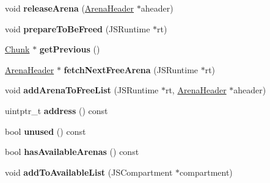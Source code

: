 \begin{DoxyCompactItemize}
\item 
\hypertarget{structjs_1_1gc_1_1_chunk_a7af13b6666f438363137ac68f96cf361}{void {\bfseries release\-Arena} (\hyperlink{structjs_1_1gc_1_1_arena_header}{Arena\-Header} $\ast$aheader)}\label{structjs_1_1gc_1_1_chunk_a7af13b6666f438363137ac68f96cf361}

\item 
\hypertarget{structjs_1_1gc_1_1_chunk_a4a41b7b1dc9e8066d4490ce9a30b75c1}{void {\bfseries prepare\-To\-Be\-Freed} (J\-S\-Runtime $\ast$rt)}\label{structjs_1_1gc_1_1_chunk_a4a41b7b1dc9e8066d4490ce9a30b75c1}

\item 
\hypertarget{structjs_1_1gc_1_1_chunk_a5dbfba26018cab3e0abc61b0b3f46f3c}{\hyperlink{structjs_1_1gc_1_1_chunk}{Chunk} $\ast$ {\bfseries get\-Previous} ()}\label{structjs_1_1gc_1_1_chunk_a5dbfba26018cab3e0abc61b0b3f46f3c}

\item 
\hypertarget{structjs_1_1gc_1_1_chunk_aaec4f13dee8aa15d1c1c41eb6d999dbe}{\hyperlink{structjs_1_1gc_1_1_arena_header}{Arena\-Header} $\ast$ {\bfseries fetch\-Next\-Free\-Arena} (J\-S\-Runtime $\ast$rt)}\label{structjs_1_1gc_1_1_chunk_aaec4f13dee8aa15d1c1c41eb6d999dbe}

\item 
\hypertarget{structjs_1_1gc_1_1_chunk_a0ad58f1e12a1a04e9476dcfd1063e554}{void {\bfseries add\-Arena\-To\-Free\-List} (J\-S\-Runtime $\ast$rt, \hyperlink{structjs_1_1gc_1_1_arena_header}{Arena\-Header} $\ast$aheader)}\label{structjs_1_1gc_1_1_chunk_a0ad58f1e12a1a04e9476dcfd1063e554}

\item 
\hypertarget{structjs_1_1gc_1_1_chunk_a131d38aac05dc13be8867726974ddeeb}{uintptr\-\_\-t {\bfseries address} () const }\label{structjs_1_1gc_1_1_chunk_a131d38aac05dc13be8867726974ddeeb}

\item 
\hypertarget{structjs_1_1gc_1_1_chunk_a4a4fd0008ac116146a22b7b30d8401ec}{bool {\bfseries unused} () const }\label{structjs_1_1gc_1_1_chunk_a4a4fd0008ac116146a22b7b30d8401ec}

\item 
\hypertarget{structjs_1_1gc_1_1_chunk_a60ddab1f056036f51c5afdc3789f8a71}{bool {\bfseries has\-Available\-Arenas} () const }\label{structjs_1_1gc_1_1_chunk_a60ddab1f056036f51c5afdc3789f8a71}

\item 
\hypertarget{structjs_1_1gc_1_1_chunk_a9035472e84d2948fb0fb37b20fe45600}{void {\bfseries add\-To\-Available\-List} (J\-S\-Compartment $\ast$compartment)}\label{structjs_1_1gc_1_1_chunk_a9035472e84d2948fb0fb37b20fe45600}


\end{DoxyCompactItemize}

